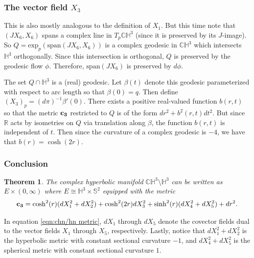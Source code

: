 \documentclass[10pt]{amsart}
\def\R{\mathbb{R}}
\def\b{\beta}
\def\H{\mathbb{H}}
\def\C{\mathbb{C}}
\newtheorem{theorem}{Theorem}[section]
\theoremstyle{definition}
\theoremstyle{remark}
\numberwithin{equation}{section}
\begin{document}
\subsubsection{The vector field $X_3$}
This is also mostly analogous to the definition of $X_1$.
But this time note that $\left( JX_6,X_6 \right)$ spans a complex line in $T_p \C \H^3$ (since it is preserved by its $J$-image).
So $Q = \text{exp}_p \left( \text{span} \left( JX_6,X_6 \right) \right)$ is a complex geodesic in $\C \H^3$ which intersects $\H^3$ orthogonally.
Since this intersection is orthogonal, $Q$ is preserved by the geodesic flow $\phi$.  
Therefore, $\text{span} \left( JX_6 \right)$ is preserved by $d \phi$.  

The set $Q \cap \H^3$ is a (real) geodesic.  
Let $\b(t)$ denote this geodesic parameterized with respect to arc length so that $\b(0) = q$.
Then define $(X_3)_p = (d \pi)^{-1} \b'(0)$.  
There exists a positive real-valued function $b(r,t)$ so that the metric ${\bf c_3}$ restricted to $Q$ is of the form $dr^2 + b^2(r,t) dt^2$.
But since $\R$ acts by isometries on $Q$ via translation along $\b$, the function $b(r,t)$ is independent of $t$.
Then since the curvature of a complex geodesic is $-4$, we have that $b(r) = \cosh(2r)$. 


\subsubsection{Conclusion}

\vskip 20pt

\begin{theorem}\label{thm:chn/hn metric}
The complex hyperbolic manifold $\C \H^3 \setminus \H^3$ can be written as $E \times (0, \infty)$  where $E \cong \H^3 \times \mathbb{S}^2$ equipped with the metric
	\begin{equation}\label{eqn:chn/hn metric}
	{\bf c_3} = \cosh^2(r) (dX_1^2 + dX_2^2) + \cosh^2(2r) dX_3^2 + \sinh^2(r) (dX_4^2 + dX_5^2) + dr^2 .
	\end{equation}
\end{theorem}

\vskip 10pt

In equation \eqref{eqn:chn/hn metric}, $dX_1$ through $dX_5$ denote the covector fields dual to the vector fields $X_1$ through $X_5$, respectively.
Lastly, notice that $dX_1^2 + dX_2^2$ is the hyperbolic metric with constant sectional curvature $-1$, and $dX_4^2 + dX_5^2$ is the spherical metric with constant sectional curvature $1$.  
\end{document}
